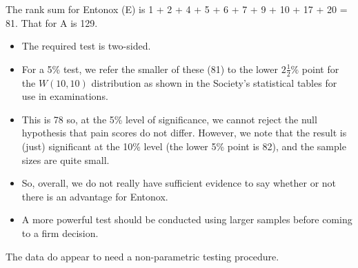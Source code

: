 \documentclass[a4paper,12pt]{article}
\begin{document}
\begin{enumerate}
\begin{center}
 \end{center}
The rank sum for Entonox (E) is 1 + 2 + 4 + 5 + 6 + 7 + 9 + 10 + 17 + 20 = 81.  That for A is 129. 
 
\begin{itemize} 
\item  The required test is two-sided.  
\item For a 5\% test, we refer the smaller of these (81) to the lower $2\frac{1}{2}\%$ point for the $W(10,10)$ distribution as shown in the Society's statistical tables for use in examinations. 
\item This is 78 so, at the 5\% level of significance, we cannot reject the null hypothesis that pain scores do not differ.  However, we note that the result is (just) significant at the 10\% level (the lower 5\% point is 82), and the sample sizes are quite small.
\item So, overall, we do not really have sufficient evidence to say whether or not there is an advantage for Entonox. 
\item A more powerful test should be conducted using larger samples before coming to a firm decision. 
\end{itemize}
The data do appear to need a non-parametric testing procedure. 
 \end{enumerate}
 
\end{document}
